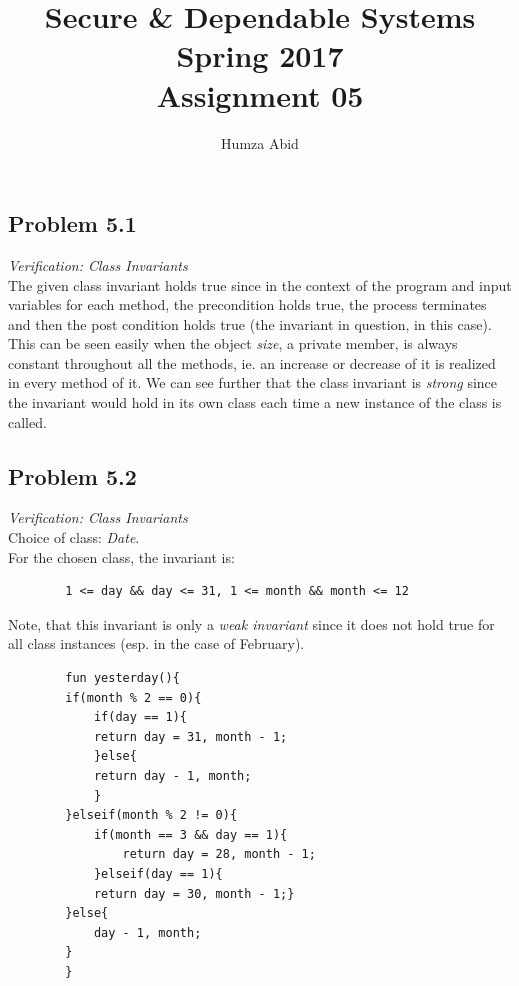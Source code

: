 \documentclass[a4paper]{article}
\begin{document}
	
	\title{Secure \& Dependable Systems \\  Spring 2017 \\ Assignment 05}
	\author{Humza Abid}
	\maketitle
	
	\subsection*{Problem 5.1} \textit{Verification: Class Invariants} \\
	
	The given class invariant holds true since in the context of the program and input variables for each method, the precondition holds true, the process terminates and then the post condition holds true (the invariant in question, in this case). This can be seen easily when the object \textit{size}, a private member, is always constant throughout all the methods, ie. an increase or decrease of it is realized in every method of it. We can see further that the class invariant is \textit{strong} since the invariant would hold in its own class each time a new instance of the class is called. 
		
	\subsection*{Problem 5.2} \textit{Verification: Class Invariants} \\
	
	Choice of class: \textit{Date}.\\
	For the chosen class, the invariant is:
	\begin{verbatim}
		1 <= day && day <= 31, 1 <= month && month <= 12        
	\end{verbatim}
	
	Note, that this invariant is only a \textit{weak invariant} since it does not hold true for all class instances (esp. in the case of February).
	
	\begin{verbatim}
		fun yesterday(){
		if(month % 2 == 0){	
			if(day == 1){
			return day = 31, month - 1;
			}else{
			return day - 1, month;
			}	
		}elseif(month % 2 != 0){
			if(month == 3 && day == 1){
				return day = 28, month - 1;
			}elseif(day == 1){
			return day = 30, month - 1;}
		}else{
			day - 1, month;
		}
		}
	\end{verbatim}
	
\end{document}
